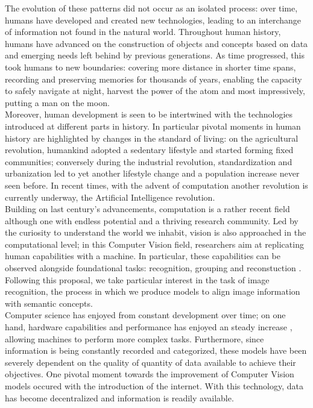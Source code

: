 \noindent The evolution of these patterns did not occur as an isolated process: 
over time, humans have developed and created new technologies, leading to an interchange of 
information not found in the natural world. Throughout human history, humans have 
advanced on the construction of objects and concepts based on data and emerging needs left behind 
by previous generations. As time progressed, this took humans to new boundaries: covering more 
distance in shorter time spans, recording and preserving memories for thousands of years, enabling 
the capacity to safely navigate at night, harvest the power of the atom and most impressively, 
putting a man on the moon.\\
Moreover, human development is seen to be intertwined with the technologies introduced 
at different parts in history. In particular pivotal moments in human history are highlighted by 
changes in the standard of living: on the agricultural revolution, humankind adopted a sedentary 
lifestyle and started forming fixed communities; conversely during the industrial revolution, 
standardization and urbanization led to yet another lifestyle change and a population increase 
never seen before. In recent times, with the advent of computation another revolution is currently 
underway, the Artificial Intelligence revolution.\\

\noindent Building on last century's advancements, computation is a rather recent field although 
one with endless potential and a thriving research community. Led by the curiosity to understand 
the world we inhabit, vision is also approached in the computational level; in this Computer Vision 
field, researchers aim at replicating human capabilities with a machine. In particular, these 
capabilities can be observed alongside foundational tasks: recognition, grouping and reconstuction
\autocite{malik2016three}. Following this proposal, we take particular interest in the task of 
image recognition, the process in which we produce models to align image information with 
semantic concepts.\\
Computer science has enjoyed from constant development over time; on one hand, hardware 
capabilities and performance has enjoyed an steady increase \autocite{schaller1997moore}, allowing 
machines to perform more complex tasks. Furthermore, since information is being constantly recorded 
and categorized, these models have been severely dependent on the quality of quantity of data 
available to achieve their objectives. One pivotal moment towards the improvement of Computer 
Vision models occured with the introduction of the internet. With this technology, data has become 
decentralized and information is readily available.\\

